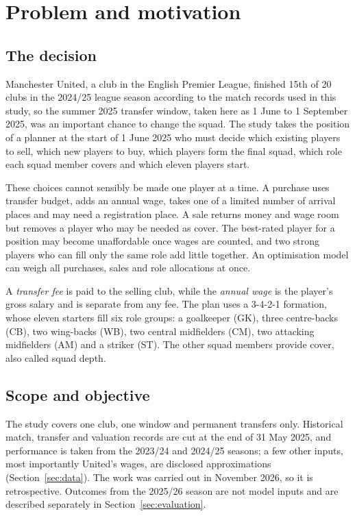 \section{Problem and motivation}\label{sec:problem}

\subsection{The decision}

Manchester United, a club in the English Premier League, finished 15th of 20 clubs in the 2024/25 league season according to the match records used in this study, so the summer 2025 transfer window, taken here as 1 June to 1 September 2025, was an important chance to change the squad. The study takes the position of a planner at the start of 1 June 2025 who must decide which existing players to sell, which new players to buy, which players form the final squad, which role each squad member covers and which eleven players start.

These choices cannot sensibly be made one player at a time. A purchase uses transfer budget, adds an annual wage, takes one of a limited number of arrival places and may need a registration place. A sale returns money and wage room but removes a player who may be needed as cover. The best-rated player for a position may become unaffordable once wages are counted, and two strong players who can fill only the same role add little together. An optimisation model can weigh all purchases, sales and role allocations at once.

A \emph{transfer fee} is paid to the selling club, while the \emph{annual wage} is the player's gross salary and is separate from any fee. The plan uses a 3-4-2-1 formation, whose eleven starters fill six role groups: a goalkeeper (GK), three centre-backs (CB), two wing-backs (WB), two central midfielders (CM), two attacking midfielders (AM) and a striker (ST). The other squad members provide cover, also called squad depth.

\subsection{Scope and objective}

The study covers one club, one window and permanent transfers only. Historical match, transfer and valuation records are cut at the end of 31 May 2025, and performance is taken from the 2023/24 and 2024/25 seasons; a few other inputs, most importantly United's wages, are disclosed approximations (Section~\ref{sec:data}). The work was carried out in November 2026, so it is retrospective. Outcomes from the 2025/26 season are not model inputs and are described separately in Section~\ref{sec:evaluation}.

